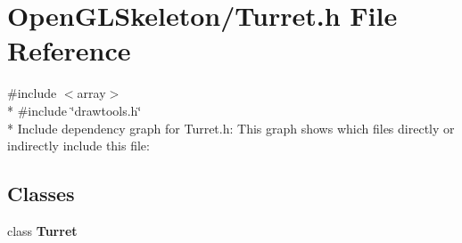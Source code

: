 \section{Open\+G\+L\+Skeleton/\+Turret.h File Reference}
\label{_turret_8h}
{\ttfamily \#include $<$array$>$}\\*
{\ttfamily \#include \char`\"{}drawtools.\+h\char`\"{}}\\*
Include dependency graph for Turret.\+h\+:
This graph shows which files directly or indirectly include this file\+:
\subsection*{Classes}
\begin{DoxyCompactItemize}
\item 
class {\bf Turret}
\end{DoxyCompactItemize}
